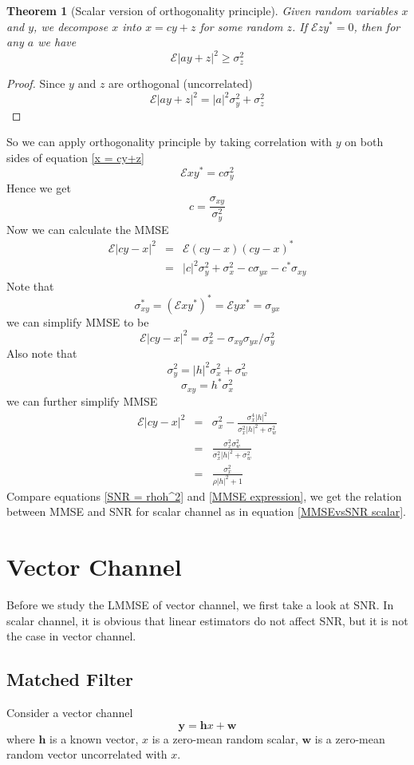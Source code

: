 \documentclass[12pt]{article}
\newtheorem{theorem}{Theorem}
\theoremstyle{definition}
\begin{document}
\begin{theorem}[Scalar version of orthogonality principle]
	Given random variables $x$ and $y$, we decompose $x$ into $x=cy+z$ for some random $z$. If $\mathcal{E}zy^*=0$, then for any $a$ we have
	$$\mathcal{E}|ay+z|^2\geq\sigma_z^2$$
\end{theorem}
\begin{proof}
	Since $y$ and $z$ are orthogonal (uncorrelated)
	$$\mathcal{E}|ay+z|^2=|a|^2\sigma_y^2+\sigma_z^2$$
\end{proof}
So we can apply orthogonality principle by taking correlation with $y$ on both sides of equation \ref{x = cy+z}
$$\mathcal{E}xy^*=c\sigma_y^2$$
Hence we get
$$c=\frac{\sigma_{xy}}{\sigma_y^2}$$
Now we can calculate the MMSE
\begin{eqnarray*}
	\mathcal{E}|cy-x|^2&=&\mathcal{E}(cy-x)(cy-x)^*\\
	&=&|c|^2\sigma_y^2+\sigma_x^2-c\sigma_{yx}-c^*\sigma_{xy}
\end{eqnarray*}
Note that
$$\sigma_{xy}^*=\left(\mathcal{E}xy^*\right)^*=\mathcal{E}yx^*=\sigma_{yx}$$
we can simplify MMSE to be
$$\mathcal{E}|cy-x|^2=\sigma_x^2-\sigma_{xy}\sigma_{yx}/\sigma_y^2$$
Also note that
$$\sigma_y^2=|h|^2\sigma_x^2+\sigma_w^2$$
$$\sigma_{xy} = h^*\sigma_x^2$$
we can further simplify MMSE
\begin{eqnarray}
	\mathcal{E}|cy-x|^2&=&\sigma_x^2-\frac{\sigma_x^4|h|^2}{\sigma_x^2|h|^2+\sigma_w^2}\nonumber\\
	&=&\frac{\sigma_x^2\sigma_w^2}{\sigma_x^2|h|^2+\sigma_w^2}\nonumber\\
	&=&\frac{\sigma_x^2}{\rho|h|^2+1}\label{MMSE expression}
\end{eqnarray}
Compare equations \ref{SNR = rhoh^2} and \ref{MMSE expression}, we get the relation between MMSE and SNR for scalar channel as in equation \ref{MMSEvsSNR scalar}.

\section{Vector Channel}
Before we study the LMMSE of vector channel, we first take a look at SNR. In scalar channel, it is obvious that linear estimators do not affect SNR, but it is not the case in vector channel.
\subsection{Matched Filter}
Consider a vector channel
$$\bm{y}=\bm{h}x+\bm{w}$$
where $\bm{h}$ is a known vector, $x$ is a zero-mean random scalar, $\bm{w}$ is a zero-mean random vector uncorrelated with $x$.
\end{document}

